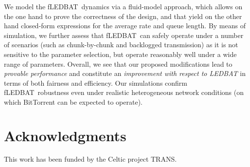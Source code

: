 \documentclass[conference]{IEEEtran}
\newcommand{\btledbat}[0]{LEDBAT}
\newcommand{\fledbat}[0]{fLEDBAT}
\begin{document}
We model the \fledbat\ dynamics via a fluid-model approach, which allows on the one hand to prove the correctness of the design, and that yield on the other hand closed-form expressions for the average rate and queue length.
By means of simulation, we further assess that \fledbat\ can safely operate under a number of scenarios (such as chunk-by-chunk and backlogged transmission) as it is not sensitive to the parameter selection, but operate reasonably well under a wide range of parameters. Overall, we see that our proposed modifications lead to \emph{provable performance} and constitute an \emph{improvement with respect to \btledbat} in terms of both fairness and efficiency. Our simulations confirm \fledbat\ robustness even under realistic heterogeneous network conditions (on which BitTorrent can be expected to operate).

\section*{Acknowledgments}
This work has been funded by the Celtic project TRANS.



\end{document}
